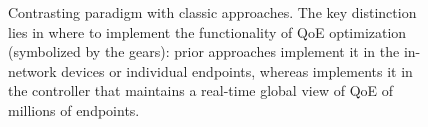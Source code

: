 



\begin{figure}[t!]
\captionsetup[subfigure]{justification=centering,farskip=-1pt,captionskip=5pt}
\centering
\caption{Contrasting \ddn paradigm with classic approaches. 
The key distinction lies in where to implement the functionality of QoE optimization 
(symbolized by the gears): prior approaches implement 
it in the in-network devices or individual endpoints, whereas \ddn implements 
it in the controller that maintains a real-time global view of QoE of millions of endpoints.}
\vspace{-0.1cm}
\label{fig:intro:contrast}
\end{figure}

